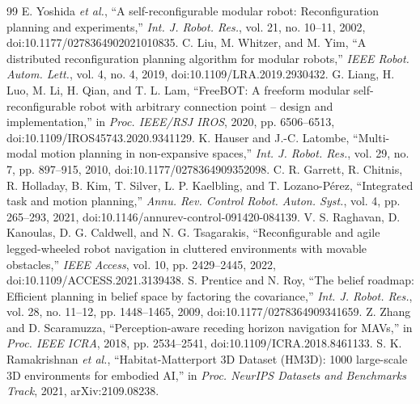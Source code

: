 \documentclass[conference]{IEEEtran}
\begin{document}
\begin{thebibliography}{99}
 E. Yoshida \emph{et al.}, ``A self-reconfigurable modular robot: Reconfiguration planning and experiments,'' \emph{Int. J. Robot. Res.}, vol. 21, no. 10--11, 2002, doi:10.1177/0278364902021010835.
 C. Liu, M. Whitzer, and M. Yim, ``A distributed reconfiguration planning algorithm for modular robots,'' \emph{IEEE Robot. Autom. Lett.}, vol. 4, no. 4, 2019, doi:10.1109/LRA.2019.2930432.
 G. Liang, H. Luo, M. Li, H. Qian, and T. L. Lam, ``FreeBOT: A freeform modular self-reconfigurable robot with arbitrary connection point -- design and implementation,'' in \emph{Proc. IEEE/RSJ IROS}, 2020, pp. 6506--6513, doi:10.1109/IROS45743.2020.9341129.
 K. Hauser and J.-C. Latombe, ``Multi-modal motion planning in non-expansive spaces,'' \emph{Int. J. Robot. Res.}, vol. 29, no. 7, pp. 897--915, 2010, doi:10.1177/0278364909352098.
 C. R. Garrett, R. Chitnis, R. Holladay, B. Kim, T. Silver, L. P. Kaelbling, and T. Lozano-P\'erez, ``Integrated task and motion planning,'' \emph{Annu. Rev. Control Robot. Auton. Syst.}, vol. 4, pp. 265--293, 2021, doi:10.1146/annurev-control-091420-084139.
 V. S. Raghavan, D. Kanoulas, D. G. Caldwell, and N. G. Tsagarakis, ``Reconfigurable and agile legged-wheeled robot navigation in cluttered environments with movable obstacles,'' \emph{IEEE Access}, vol. 10, pp. 2429--2445, 2022, doi:10.1109/ACCESS.2021.3139438.
 S. Prentice and N. Roy, ``The belief roadmap: Efficient planning in belief space by factoring the covariance,'' \emph{Int. J. Robot. Res.}, vol. 28, no. 11--12, pp. 1448--1465, 2009, doi:10.1177/0278364909341659.
 Z. Zhang and D. Scaramuzza, ``Perception-aware receding horizon navigation for MAVs,'' in \emph{Proc. IEEE ICRA}, 2018, pp. 2534--2541, doi:10.1109/ICRA.2018.8461133.
 S. K. Ramakrishnan \emph{et al.}, ``Habitat-Matterport 3D Dataset (HM3D): 1000 large-scale 3D environments for embodied AI,'' in \emph{Proc. NeurIPS Datasets and Benchmarks Track}, 2021, arXiv:2109.08238.
\end{thebibliography}
\end{document}
